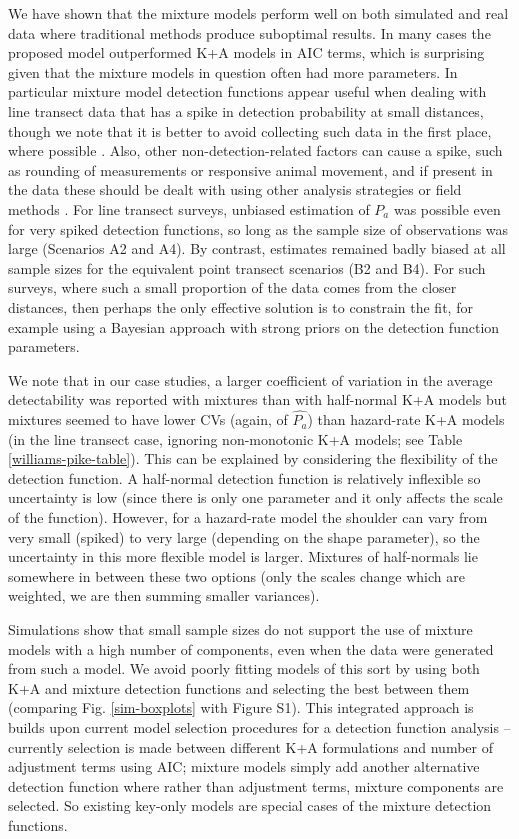 \documentclass[10pt]{article}
\begin{document}
We have shown that the mixture models perform well on both simulated and real data where traditional methods produce suboptimal results. In many cases the proposed model outperformed K+A models in AIC terms, which is surprising given that the mixture models in question often had more parameters. In particular mixture model detection functions appear useful when dealing with line transect data that has a spike in detection probability at small distances, though we note that it is better to avoid collecting such data in the first place, where possible \cite[, p. 42]{Buckland:2001vm}.  Also, other non-detection-related factors can cause a spike, such as rounding of measurements or responsive animal movement, and if present in the data these should be dealt with using other analysis strategies or field methods \cite{Buckland:2001vm}.  For line transect surveys, unbiased estimation of $P_a$ was possible even for very spiked detection functions, so long as the sample size of observations was large (Scenarios A2 and A4).  By contrast, estimates remained badly biased at all sample sizes for the equivalent point transect scenarios (B2 and B4). For such surveys, where such a small proportion of the data comes from the closer distances, then perhaps the only effective solution is to constrain the fit, for example using a Bayesian approach with strong priors on the detection function parameters.

We note that in our case studies, a larger coefficient of variation in the average detectability was reported with mixtures than with half-normal K+A models but mixtures seemed to have lower CVs (again, of $\hat{P_a}$) than hazard-rate K+A models (in the line transect case, ignoring non-monotonic K+A models; see Table \ref{williams-pike-table}). This can be explained by considering the flexibility of the detection function. A half-normal detection function is relatively inflexible so uncertainty is low (since there is only one parameter and it only affects the scale of the function). However, for a hazard-rate model the shoulder can vary from very small (spiked) to very large (depending on the shape parameter), so the uncertainty in this more flexible model is larger. Mixtures of half-normals lie somewhere in between these two options (only the scales change which are weighted, we are then summing smaller variances). 

Simulations show that small sample sizes do not support the use of mixture models with a high number of components, even when the data were generated from such a model. We avoid poorly fitting models of this sort by using both K+A and mixture detection functions and selecting the best between them (comparing Fig. \ref{sim-boxplots} with Figure S1). This integrated approach is builds upon current model selection procedures for a detection function analysis -- currently selection is made between different K+A formulations and number of adjustment terms using AIC; mixture models simply add another alternative detection function where rather than adjustment terms, mixture components are selected. So existing key-only models are special cases of the mixture detection functions.
\end{document}
